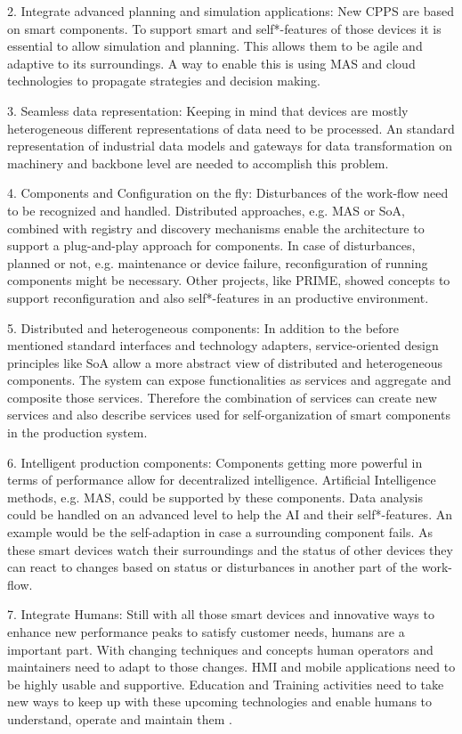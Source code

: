 \documentclass[conference,compsoc]{IEEEtran}
\begin{document}
2. Integrate advanced planning and simulation applications: New CPPS are based on smart components. To support smart and self*-features of those devices it is essential to allow simulation and planning. This allows them to be agile and adaptive to its surroundings. A way to enable this is using MAS and cloud technologies to propagate strategies and decision making.

3. Seamless data representation: Keeping in mind that devices are mostly heterogeneous different representations of data need to be processed. An standard representation of industrial data models and gateways for data transformation on machinery and backbone level are needed to accomplish this problem.

4. Components and Configuration on the fly: Disturbances of the work-flow need to be recognized and handled. Distributed approaches, e.g. MAS or SoA, combined with registry and discovery mechanisms enable the architecture to support a plug-and-play approach for components. In case of disturbances, planned or not, e.g. maintenance or device failure, reconfiguration of running components might be necessary. Other projects, like PRIME, showed concepts to support reconfiguration and also self*-features in an productive environment.

5. Distributed and heterogeneous components: In addition to the before mentioned standard interfaces and technology adapters, service-oriented design principles like SoA allow a more abstract view of distributed and heterogeneous components. The system can expose functionalities as services and aggregate and composite those services. Therefore the combination of services can create new services and also describe services used for self-organization of smart components in the production system.

6. Intelligent production components: Components getting more powerful in terms of performance allow for decentralized intelligence. Artificial Intelligence methods, e.g. MAS, could be supported by these components. Data analysis could be handled on an advanced level to help the AI and their self*-features. An example would be the self-adaption in case a surrounding component fails. As these smart devices watch their surroundings and the status of other devices they can react to changes based on status or disturbances in another part of the work-flow.

7. Integrate Humans: Still with all those smart devices and innovative ways to enhance new performance peaks to satisfy customer needs, humans are a important part. With changing techniques and concepts human operators and maintainers need to adapt to those changes. HMI and mobile applications need to be highly usable and supportive. Education and Training activities need to take new ways to keep up with these upcoming technologies and enable humans to understand, operate and maintain them \cite{SpecPERFoRM}.
\end{document}
